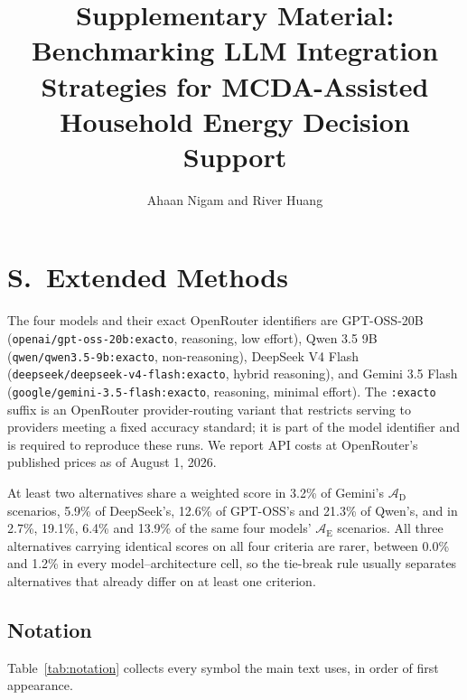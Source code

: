 \documentclass[11pt]{article}
\title{Supplementary Material: Benchmarking LLM Integration Strategies for MCDA-Assisted Household Energy Decision Support}
\author{Ahaan Nigam and River Huang}
\date{}
\newcounter{suppsectioncounter}
\newcommand{\suppsection}[1]{%
  \stepcounter{suppsectioncounter}%
  \section*{S\thesuppsectioncounter.\ #1}%
  \setcounter{table}{0}\setcounter{figure}{0}\setcounter{equation}{0}%
  \setcounter{section}{\value{suppsectioncounter}}\setcounter{subsection}{0}%
  \renewcommand{\theHtable}{S\thesuppsectioncounter.\arabic{table}}%
  \renewcommand{\theHfigure}{S\thesuppsectioncounter.\arabic{figure}}%
}
\begin{document}
\maketitle
\suppsection{Extended Methods}
\label{app:model_routing}

The four models and their exact OpenRouter identifiers are GPT-OSS-20B (\texttt{openai/gpt-oss-20b:exacto}, reasoning, low effort), Qwen 3.5 9B (\texttt{qwen/qwen3.5-9b:exacto}, non-reasoning), DeepSeek V4 Flash (\texttt{deepseek/deepseek-v4-flash:exacto}, hybrid reasoning), and Gemini 3.5 Flash (\texttt{google/gemini-3.5-flash:exacto}, reasoning, minimal effort). The \texttt{:exacto} suffix is an OpenRouter provider-routing variant that restricts serving to providers meeting a fixed accuracy standard; it is part of the model identifier and is required to reproduce these runs. We report API costs at OpenRouter's published prices as of August 1, 2026.

At least two alternatives share a weighted score in 3.2\% of Gemini's $\mathcal{A}_{\text{D}}$ scenarios, 5.9\% of DeepSeek's, 12.6\% of GPT-OSS's and 21.3\% of Qwen's, and in 2.7\%, 19.1\%, 6.4\% and 13.9\% of the same four models' $\mathcal{A}_{\text{E}}$ scenarios. All three alternatives carrying identical scores on all four criteria are rarer, between 0.0\% and 1.2\% in every model--architecture cell, so the tie-break rule usually separates alternatives that already differ on at least one criterion.
\subsection{Notation}
\label{app:notation}

Table~\ref{tab:notation} collects every symbol the main text uses, in order of first appearance.
\end{document}
